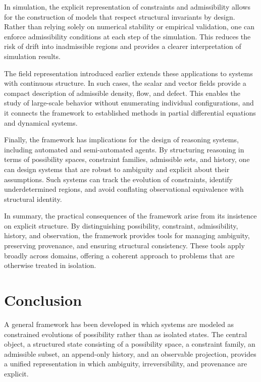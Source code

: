 \documentclass[11pt,oneside]{article}
\begin{document}
In simulation, the explicit representation of constraints and admissibility allows for the construction of models that respect structural invariants by design. Rather than relying solely on numerical stability or empirical validation, one can enforce admissibility conditions at each step of the simulation. This reduces the risk of drift into inadmissible regions and provides a clearer interpretation of simulation results.

The field representation introduced earlier extends these applications to systems with continuous structure. In such cases, the scalar and vector fields provide a compact description of admissible density, flow, and defect. This enables the study of large-scale behavior without enumerating individual configurations, and it connects the framework to established methods in partial differential equations and dynamical systems.

Finally, the framework has implications for the design of reasoning systems, including automated and semi-automated agents. By structuring reasoning in terms of possibility spaces, constraint families, admissible sets, and history, one can design systems that are robust to ambiguity and explicit about their assumptions. Such systems can track the evolution of constraints, identify underdetermined regions, and avoid conflating observational equivalence with structural identity.

In summary, the practical consequences of the framework arise from its insistence on explicit structure. By distinguishing possibility, constraint, admissibility, history, and observation, the framework provides tools for managing ambiguity, preserving provenance, and ensuring structural consistency. These tools apply broadly across domains, offering a coherent approach to problems that are otherwise treated in isolation.

\section{Conclusion}

A general framework has been developed in which systems are modeled as constrained evolutions of possibility rather than as isolated states. The central object, a structured state consisting of a possibility space, a constraint family, an admissible subset, an append-only history, and an observable projection, provides a unified representation in which ambiguity, irreversibility, and provenance are explicit.
\end{document}
